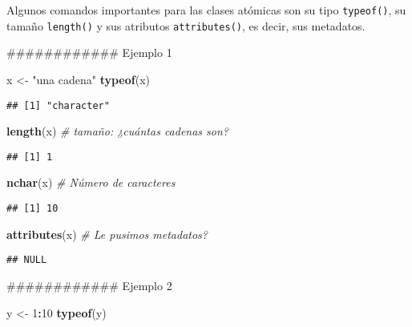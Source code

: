 \documentclass[]{article}
\newenvironment{Shaded}{\begin{snugshade}}{\end{snugshade}}
\newcommand{\KeywordTok}[1]{\textcolor[rgb]{0.13,0.29,0.53}{\textbf{#1}}}
\newcommand{\DecValTok}[1]{\textcolor[rgb]{0.00,0.00,0.81}{#1}}
\newcommand{\StringTok}[1]{\textcolor[rgb]{0.31,0.60,0.02}{#1}}
\newcommand{\CommentTok}[1]{\textcolor[rgb]{0.56,0.35,0.01}{\textit{#1}}}
\newcommand{\OperatorTok}[1]{\textcolor[rgb]{0.81,0.36,0.00}{\textbf{#1}}}
\newcommand{\NormalTok}[1]{#1}
\begin{document}
Algunos comandos importantes para las clases atómicas son su tipo
\texttt{typeof()}, su tamaño \texttt{length()} y sus atributos
\texttt{attributes()}, es decir, sus metadatos.

\begin{Shaded}
\begin{Highlighting}[]
\NormalTok{############ Ejemplo 1}

\NormalTok{x <-}\StringTok{ "una cadena"}
\KeywordTok{typeof}\NormalTok{(x)}
\end{Highlighting}
\end{Shaded}

\begin{verbatim}
## [1] "character"
\end{verbatim}

\begin{Shaded}
\begin{Highlighting}[]
\KeywordTok{length}\NormalTok{(x) }\CommentTok{# tamaño: ¿cuántas cadenas son?}
\end{Highlighting}
\end{Shaded}

\begin{verbatim}
## [1] 1
\end{verbatim}

\begin{Shaded}
\begin{Highlighting}[]
\KeywordTok{nchar}\NormalTok{(x) }\CommentTok{# Número de caracteres}
\end{Highlighting}
\end{Shaded}

\begin{verbatim}
## [1] 10
\end{verbatim}

\begin{Shaded}
\begin{Highlighting}[]
\KeywordTok{attributes}\NormalTok{(x) }\CommentTok{# Le pusimos metadatos?}
\end{Highlighting}
\end{Shaded}

\begin{verbatim}
## NULL
\end{verbatim}

\begin{Shaded}
\begin{Highlighting}[]
\NormalTok{############ Ejemplo 2}

\NormalTok{y <-}\StringTok{ }\DecValTok{1}\OperatorTok{:}\DecValTok{10}
\KeywordTok{typeof}\NormalTok{(y)}
\end{Highlighting}
\end{Shaded}
\end{document}
